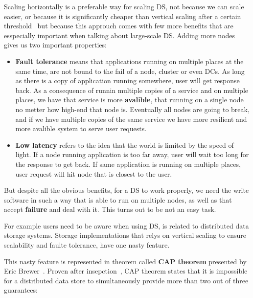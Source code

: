 Scaling horizontally is a preferable way for scaling DS, not because we can scale easier, or because it is significantly cheaper than vertical scaling after a certain threshold~\cite{Bondi00} but because this approuch comes with few more benefits that are esspecially important when talking about large-scale DS. Adding more nodes gives us two important properties: 

\begin{itemize}
	\item \textbf{Fault tolerance} means that applications running on multiple places at the same time, are not bound to the fail of a node, cluster or even DCs. As long as there is a copy of application running somewhere, user will get response back. As a consequence of runnin multiple copies of a service and on multiple places, we have that service is more \textbf{avalible}, that running on a single node no metter how high-end that node is. Eventually all nodes are going to break, and if we have multiple copies of the same service we have more resilient and more avalible system to serve user requests.
	\item \textbf{Low latency} refers to the idea that the world is limited by the speed of light. If a node running application is too far away, user will wait too long for the response to get back. If same application is running on multiple places, user request will hit node that is closest to the user.
\end{itemize}

But despite all the obvious benefits, for a DS to work properly, we need the write software in such a way that is able to run on multiple nodes, as well as that accept \textbf{failure} and deal with it. This turns out to be not an easy task.

For example users need to be aware when using DS, is related to distributed data storage systems. Storage implementations that relys on vertical scaling to ensure scalability and faulte tolerance, have one nasty feature. 

This nasty feature is represented in theorem called \textbf{CAP theorem} presented by Eric Brewer~\cite{Brewer2000}. Proven after insepction~\cite{GilbertL02}, CAP theorem states that it is impossible for a distributed data store to simultaneously provide more than two out of three guarantees:

